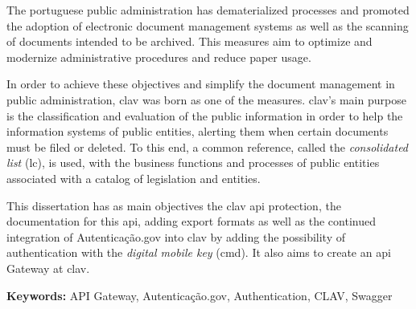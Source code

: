 The portuguese public administration has dematerialized processes and promoted the adoption of electronic document management systems as well as the scanning of documents intended to be archived. This measures aim to optimize and modernize administrative procedures and reduce paper usage.

In order to achieve these objectives and simplify the document management in public administration, \acrshort{clav} was born as one of the measures. \acrshort{clav}'s main purpose is the classification and evaluation of the public information in order to help the information systems of public entities, alerting them when certain documents must be filed or deleted. To this end, a common reference, called the \textit{consolidated list} (\acrlong{lc}), is used, with the business functions and processes of public entities associated with a catalog of legislation and entities.

This dissertation has as main objectives the \acrshort{clav} \acrshort{api} protection, the documentation for this \acrshort{api}, adding export formats as well as the continued integration of Autenticação.gov into \acrshort{clav} by adding the possibility of authentication with the \textit{digital mobile key} (\acrlong{cmd}). It also aims to create an \acrshort{api} Gateway at \acrshort{clav}.

\vspace{1cm}

\textbf{Keywords:} API Gateway, Autenticação.gov, Authentication, CLAV, Swagger
